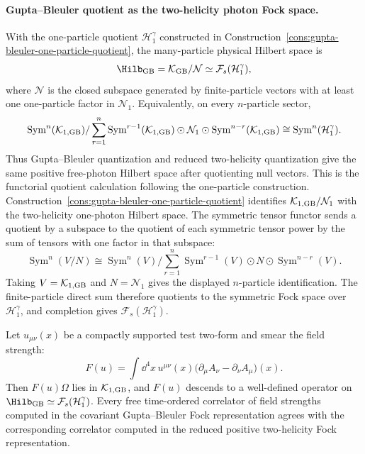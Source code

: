 \paragraph{Gupta--Bleuler quotient as the two-helicity photon Fock space.}
With the one-particle quotient \(\mathcal H_1^\gamma\) constructed in
Construction~\ref{cons:gupta-bleuler-one-particle-quotient}, the many-particle
physical Hilbert space is
\[
  \Hilb_{\rm GB}
  =
  \mathcal K_{\rm GB}/\mathcal N
  \simeq
  \mathcal F_s(\mathcal H_1^\gamma),
\]
where \(\mathcal N\) is the closed subspace generated by finite-particle
vectors with at least one one-particle factor in \(\mathcal N_1\).
Equivalently, on every \(n\)-particle sector,
\[
  \operatorname{Sym}^n(\mathcal K_{1,{\rm GB}})/
  \sum_{r=1}^n
  \operatorname{Sym}^{r-1}(\mathcal K_{1,{\rm GB}})
  \odot\mathcal N_1\odot
  \operatorname{Sym}^{n-r}(\mathcal K_{1,{\rm GB}})
  \cong
  \operatorname{Sym}^n(\mathcal H_1^\gamma).
\]
Thus Gupta--Bleuler quantization and reduced two-helicity quantization give
the same positive free-photon Hilbert space after quotienting null vectors.
This is the functorial quotient calculation following the one-particle
construction.  Construction~\ref{cons:gupta-bleuler-one-particle-quotient}
identifies
\(\mathcal K_{1,{\rm GB}}/\mathcal N_1\) with the two-helicity one-photon
Hilbert space.  The symmetric tensor functor sends a quotient by a subspace
to the quotient of each symmetric tensor power by the sum of tensors with one
factor in that subspace:
\[
  \operatorname{Sym}^n(V/N)
  \cong
  \operatorname{Sym}^n(V)/
  \sum_{r=1}^n
  \operatorname{Sym}^{r-1}(V)\odot N\odot\operatorname{Sym}^{n-r}(V).
\]
Taking \(V=\mathcal K_{1,{\rm GB}}\) and \(N=\mathcal N_1\) gives the
displayed \(n\)-particle identification.  The finite-particle direct sum
therefore quotients to the symmetric Fock space over
\(\mathcal H_1^\gamma\), and completion gives
\(\mathcal F_s(\mathcal H_1^\gamma)\).

\begin{proposition}
\label{prop:field-strength-descends-gupta-bleuler}
Let \(u_{\mu\nu}(x)\) be a compactly supported test two-form and smear the
field strength:
\[
  F(u)
  =
  \int\dd^4x\,u^{\mu\nu}(x)
  \bigl(\partial_\mu A_\nu-\partial_\nu A_\mu\bigr)(x).
\]
Then \(F(u)\Omega\) lies in \(\mathcal K_{1,{\rm GB}}\), and \(F(u)\)
descends to a well-defined operator on
\(\Hilb_{\rm GB}\simeq\mathcal F_s(\mathcal H_1^\gamma)\).  Every free
time-ordered correlator of field strengths computed in the covariant
Gupta--Bleuler Fock representation agrees with the corresponding correlator
computed in the reduced positive two-helicity Fock representation.
\end{proposition}

